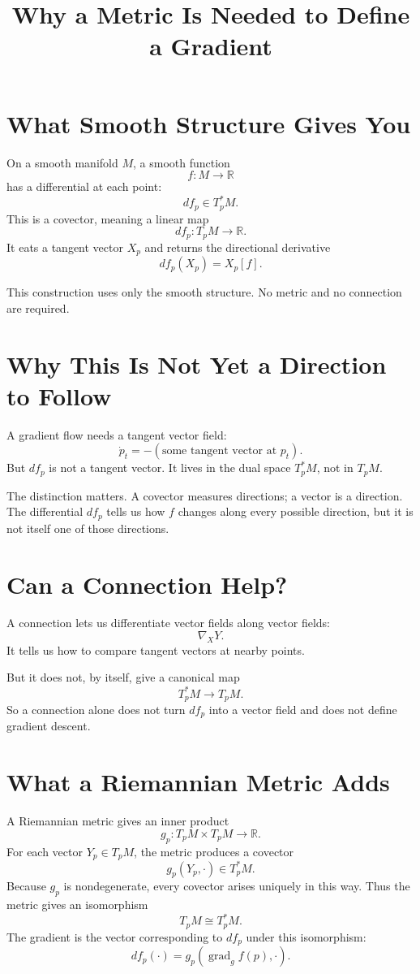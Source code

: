 \documentclass[11pt]{article}
\title{Why a Metric Is Needed to Define a Gradient}
\author{}
\date{}
\begin{document}
\maketitle

\section*{What Smooth Structure Gives You}

On a smooth manifold $M$, a smooth function
\[
f:M\to\mathbb R
\]
has a differential at each point:
\[
df_p\in T_p^*M.
\]
This is a covector, meaning a linear map
\[
df_p:T_pM\to\mathbb R.
\]
It eats a tangent vector $X_p$ and returns the directional derivative
\[
df_p(X_p)=X_p[f].
\]

This construction uses only the smooth structure. No metric and no connection
are required.

\section*{Why This Is Not Yet a Direction to Follow}

A gradient flow needs a tangent vector field:
\[
\dot p_t = -(\text{some tangent vector at }p_t).
\]
But $df_p$ is not a tangent vector. It lives in the dual space $T_p^*M$, not in
$T_pM$.

The distinction matters. A covector measures directions; a vector is a
direction. The differential $df_p$ tells us how $f$ changes along every
possible direction, but it is not itself one of those directions.

\section*{Can a Connection Help?}

A connection lets us differentiate vector fields along vector fields:
\[
\nabla_XY.
\]
It tells us how to compare tangent vectors at nearby points.

But it does not, by itself, give a canonical map
\[
T_p^*M\to T_pM.
\]
So a connection alone does not turn $df_p$ into a vector field and does not
define gradient descent.

\section*{What a Riemannian Metric Adds}

A Riemannian metric gives an inner product
\[
g_p:T_pM\times T_pM\to\mathbb R.
\]
For each vector $Y_p\in T_pM$, the metric produces a covector
\[
g_p(Y_p,\cdot)\in T_p^*M.
\]
Because $g_p$ is nondegenerate, every covector arises uniquely in this way.
Thus the metric gives an isomorphism
\[
T_pM \cong T_p^*M.
\]
The gradient is the vector corresponding to $df_p$ under this isomorphism:
\[
df_p(\cdot)=g_p(\operatorname{grad}_g f(p),\cdot).
\]
\end{document}
